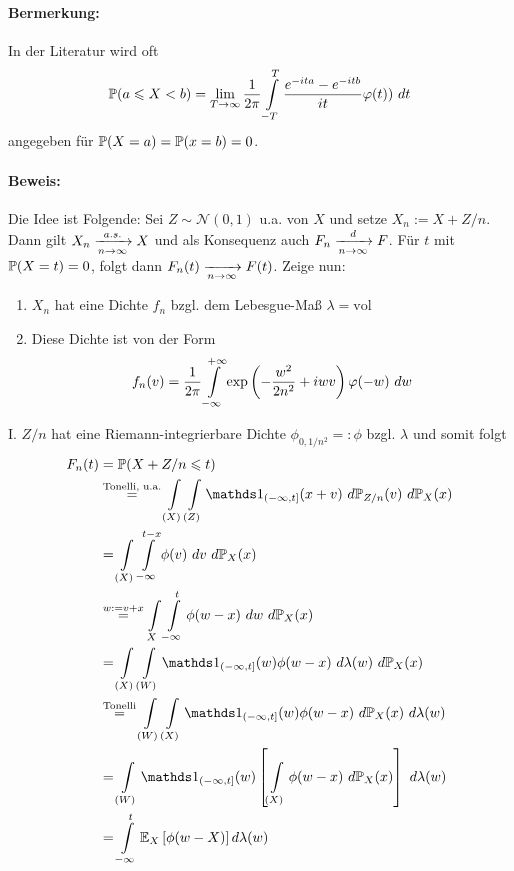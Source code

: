 \documentclass[11pt]{report}
\begin{document}
\paragraph{Bermerkung:} In der Literatur wird oft 
$$\Pp(a\leq X<b)=\lim_{T\to\infty}\dfrac{1}{2\pi}\int\displaylimits_{-T}^T\dfrac{e^{-ita}-e^{-itb}}{it}\varphi(t))\ dt$$
angegeben f\"ur $\mathbb{P}(X=a)=\mathbb{P}(x=b)=0$.

\paragraph{Beweis:} Die Idee ist Folgende: \newline
Sei $Z\sim\mathcal{N}(0,1)$ u.a. von $X$ und setze $X_n:=X+Z/n$. Dann gilt $X_n\nto{a.s.}{n\to\infty}X$ und als Konsequenz auch $F_n\nto{d}{n\to\infty}F$. F\"ur $t$ mit $\mathbb{P}(X=t)=0$, folgt dann $F_n(t)\nto{}{n\to\infty}F(t)$. Zeige nun: 
\begin{enumerate}[label=\Roman*.]
    \item $X_n$ hat eine Dichte $f_n$ bzgl. dem Lebesgue-Ma\ss{} $\lambda=\text{vol}$
    \item Diese Dichte ist von der Form 
    $$f_n(v)=\dfrac{1}{2\pi}\int\displaylimits_{-\infty}^{+\infty}\exp\left(-\dfrac{w^2}{2n^2}+iwv\right)\varphi(-w)\ dw$$
\end{enumerate}
\vspace{1ex}
I. $Z/n$ hat eine Riemann-integrierbare Dichte $\phi_{0,1/n^2}=:\phi$ bzgl. $\lambda$ und somit folgt
\begin{align*}
    F_n(t)&=\Pp(X+Z/n\leq t)\\
    &\overset{\text{Tonelli, u.a.}}{=}\int\displaylimits_{(X)}\int\displaylimits_{(Z)}\ind{(-\infty,t]}(x+v)\ d\Pp_{Z/n}(v)\ d\Pp_X(x) \\
    &=\int\displaylimits_{(X)}\int\displaylimits_{-\infty}^{t-x}\phi(v)\ dv\ d\Pp_X(x) \\
    &\overset{w:=v+x}{=}\int\displaylimits_{X}\int\displaylimits_{-\infty}^t \phi(w-x)\ dw\ d\Pp_X(x) \\
    &=\int\displaylimits_{(X)}\int\displaylimits_{(W)}\ind{(-\infty,t]}(w)\phi(w-x)\ d\lambda(w)\ d\Pp_X(x) \\
    &\overset{\text{Tonelli}}{=}\int\displaylimits_{(W)}\int\displaylimits_{(X)}\ind{(-\infty,t]}(w)\phi(w-x)\ d\Pp_X(x)\ d\lambda(w) \\
    &=\int\displaylimits_{(W)}\ind{(-\infty,t]}(w)\left[\int\displaylimits_{(X)}\phi(w-x)\ d\Pp_X(x)\right]\ d\lambda(w) \\
    &=\int\displaylimits_{-\infty}^t \E_X\left[\phi(w-X)\right]d\lambda(w)
\end{align*}
\end{document}
